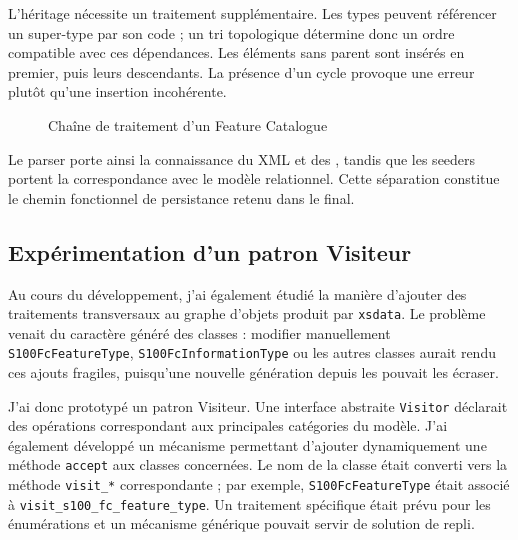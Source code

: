 L'héritage nécessite un traitement supplémentaire. Les types peuvent référencer un super-type par son code ; un tri topologique détermine donc un ordre compatible avec ces dépendances. Les éléments sans parent sont insérés en premier, puis leurs descendants. La présence d'un cycle provoque une erreur plutôt qu'une insertion incohérente.

\begin{figure}[H]
\centering
{}
\caption{Chaîne de traitement d'un Feature Catalogue }
\label{fig:chaine-parser-seeder}
\end{figure}

Le parser porte ainsi la connaissance du XML et des , tandis que les seeders portent la correspondance avec le modèle relationnel. Cette séparation constitue le chemin fonctionnel de persistance retenu dans le  final.

\subsection{Expérimentation d'un patron Visiteur}

Au cours du développement, j'ai également étudié la manière d'ajouter des traitements transversaux au graphe d'objets produit par \texttt{xsdata}. Le problème venait du caractère généré des classes : modifier manuellement \texttt{S100FcFeatureType}, \texttt{S100FcInformationType} ou les autres classes aurait rendu ces ajouts fragiles, puisqu'une nouvelle génération depuis les  pouvait les écraser.

J'ai donc prototypé un patron Visiteur. Une interface abstraite \texttt{Visitor} déclarait des opérations correspondant aux principales catégories du modèle. J'ai également développé un mécanisme permettant d'ajouter dynamiquement une méthode \texttt{accept} aux classes concernées. Le nom de la classe était converti vers la méthode \texttt{visit\_*} correspondante ; par exemple, \texttt{S100FcFeatureType} était associé à \texttt{visit\_s100\_fc\_feature\_type}. Un traitement spécifique était prévu pour les énumérations et un mécanisme générique pouvait servir de solution de repli.

